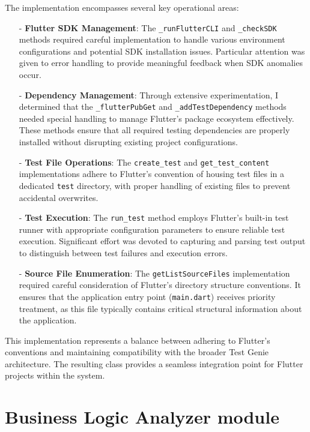 The implementation encompasses several key operational areas:
\begin{itemize}
    \item[-] \textbf{Flutter SDK Management}: The \texttt{\_runFlutterCLI} and \texttt{\_checkSDK} methods required careful implementation to handle various environment configurations and potential SDK installation issues. Particular attention was given to error handling to provide meaningful feedback when SDK anomalies occur.
    
    \item[-] \textbf{Dependency Management}: Through extensive experimentation, I determined that the \texttt{\_flutterPubGet} and \texttt{\_addTestDependency} methods needed special handling to manage Flutter's package ecosystem effectively. These methods ensure that all required testing dependencies are properly installed without disrupting existing project configurations.
    
    \item[-] \textbf{Test File Operations}: The \texttt{create\_test} and \texttt{get\_test\_content} implementations adhere to Flutter's convention of housing test files in a dedicated \texttt{test} directory, with proper handling of existing files to prevent accidental overwrites.
    
    \item[-] \textbf{Test Execution}: The \texttt{run\_test} method employs Flutter's built-in test runner with appropriate configuration parameters to ensure reliable test execution. Significant effort was devoted to capturing and parsing test output to distinguish between test failures and execution errors.
    
    \item[-] \textbf{Source File Enumeration}: The \texttt{getListSourceFiles} implementation required careful consideration of Flutter's directory structure conventions. It ensures that the application entry point (\texttt{main.dart}) receives priority treatment, as this file typically contains critical structural information about the application.
\end{itemize}

This implementation represents a balance between adhering to Flutter's conventions and maintaining compatibility with the broader Test Genie architecture. The resulting class provides a seamless integration point for Flutter projects within the system.

\section{Business Logic Analyzer module}

